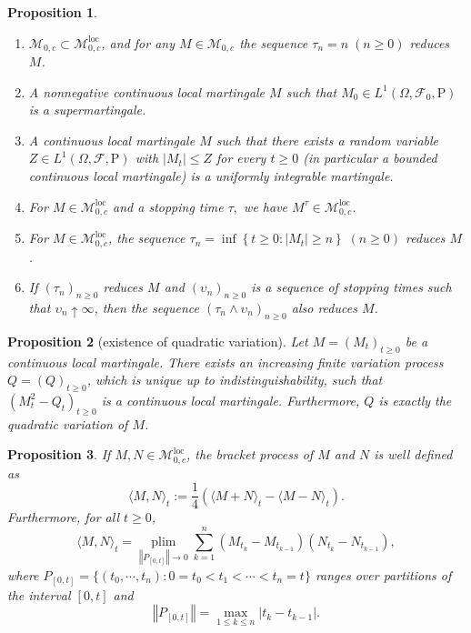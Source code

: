 \documentclass{article}
\newtheorem{proposition}{Proposition}[section]
\theoremstyle{nonumberplain}
\begin{document}
\begin{proposition}~\\
	\begin{enumerate}
		\item $\mathscr{M}_{0,c}\subset\mathscr{M}^{\mathrm{loc}}_{0,c}$, and for any $M\in\mathscr{M}_{0,c}$ the sequence $\tau_{n}=n\;(n\ge0)$ reduces $M$. 
		\item A nonnegative continuous local martingale $M$ such that $M_{0} \in L^{1}(\Omega,\mathcal{F}_0,\mathrm{P})$ is a supermartingale.
		\item A continuous local martingale $M$ such that there exists a random variable $Z \in L^{1}(\Omega,\mathcal{F},\mathrm{P})$ with $\left|M_{t}\right| \leq Z$ for every $t \geq 0$ (in particular a bounded continuous local martingale) is a uniformly integrable martingale.
		\item For $M \in \mathscr{M}^{\mathrm{loc}}_{0,c}$ and a stopping time $\tau,$ we have $M^{\tau} \in \mathscr{M}^{\mathrm{loc}}_{0,c}$.
		\item For $M \in \mathscr{M}^{\mathrm{loc}}_{0,c}$, the sequence
		$\tau_{n}=\inf \left\{t \geq 0:\left|M_{t}\right| \geq n\right\}\;(n\ge0)$	reduces $M$.
		\item If $\left(\tau_{n}\right)_{n\ge0}$ reduces $M$ and $\left(\upsilon_{n}\right)_{n\ge0}$ is a sequence of stopping times such that $\upsilon_{n} \uparrow \infty$, then the sequence $\left(\tau_{n} \wedge \upsilon_{n}\right)_{n\ge0}$ also reduces $M$.
	\end{enumerate}
\end{proposition}

\begin{proposition}[existence of quadratic variation]	
	Let $M=\left(M_{t}\right)_{t \geq 0}$ be a continuous local martingale. There exists an	increasing finite variation process $Q=\left(Q\right)_{t \geq 0}$, which is unique up to indistinguishability, such that $(M_{t}^{2}-Q_{t})_{t \geq 0}$ is a continuous local martingale. Furthermore, $Q$ is exactly the quadratic variation of $M$.
\end{proposition}

\begin{proposition}
	If $M,N\in \mathscr{M}^{\mathrm{loc}}_{0,c}$, the bracket process of $M$ and $N$ is well defined as
	\[
	\langle M, N\rangle_{t}:=\frac{1}{4}\left(\langle M+N\rangle_{t}-\langle M-N\rangle_{t}\right).
	\]
	Furthermore, for all $t\ge0$,
	\[
	\langle M, N\rangle_{t}=\mathop{\mathrm{plim}}\limits_{\left\Vert P_{[0,t]}\right\Vert \rightarrow 0} \sum_{k=1}^{n}\left(M_{t_{k}}-M_{t_{k-1}}\right)\left(N_{t_{k}}-N_{t_{k-1}}\right),
	\]
	where $P_{[0,t]}=\{(t_0,\cdots,t_n):0=t_0<t_1<\cdots<t_n=t\}$ ranges over partitions of the interval $[0,t]$ and 
	\[
	\left\Vert P_{[0,t]}\right\Vert=\max\limits_{1\le k\le n}{|t_k-t_{k-1}|}.
	\]
\end{proposition}
\end{document}
